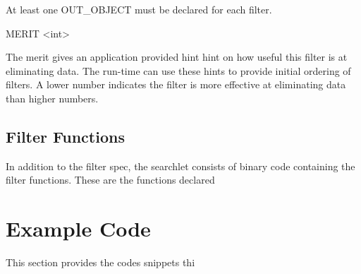 At least one OUT_OBJECT must be declared for each filter.

MERIT	<int>

The merit gives an application provided hint hint on how useful
this filter is at eliminating data.  The run-time can use
these hints to provide initial ordering of filters. A lower number
indicates the filter is more effective at eliminating data
than higher numbers. 

\subsection{Filter Functions}

In addition to the filter spec, the searchlet consists of binary code
containing the filter functions.  These are the functions declared


\section{Example Code}
\label{examplecode}

This section provides the codes snippets thi



